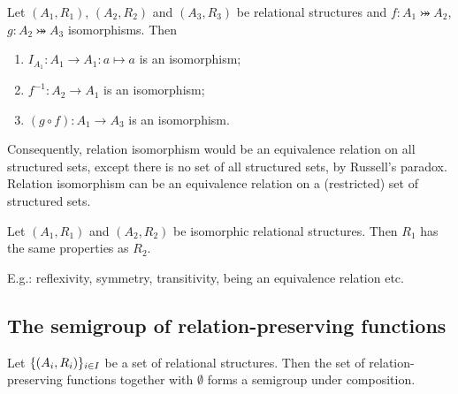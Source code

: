 \begin{lemma} \label{isomorphismEquivalence}
Let $(A_1, R_1)$, $(A_2, R_2)$ and $(A_3, R_3)$ be relational structures and $f:A_1 \twoheadrightarrowtail A_2$, $g:A_2 \twoheadrightarrowtail A_3$ isomorphisms. Then
\begin{enumerate}
\item $I_{A_1}: A_1 \to A_1: a\mapsto a$ is an isomorphism;
\item $f^{-1}: A_2\to A_1$ is an isomorphism;
\item $(g\circ f): A_1\to A_3$ is an isomorphism.
\end{enumerate}
\end{lemma}
Consequently, relation isomorphism would be an equivalence relation on all structured sets, except there is no set of all structured sets, by Russell's paradox. Relation isomorphism can be an equivalence relation on a (restricted) set of structured sets.

\begin{lemma}
Let $(A_1, R_1)$ and $(A_2, R_2)$ be isomorphic relational structures. Then $R_1$ has the same properties as $R_2$.
\end{lemma}
E.g.: reflexivity, symmetry, transitivity, being an equivalence relation etc.


\subsection{The semigroup of relation-preserving functions}
\begin{lemma}
Let $\{\left( A_i, R_i \right)\}_{i\in I}$ be a set of relational structures. Then the set of relation-preserving functions together with $\emptyset$ forms a semigroup under composition.
\end{lemma}



